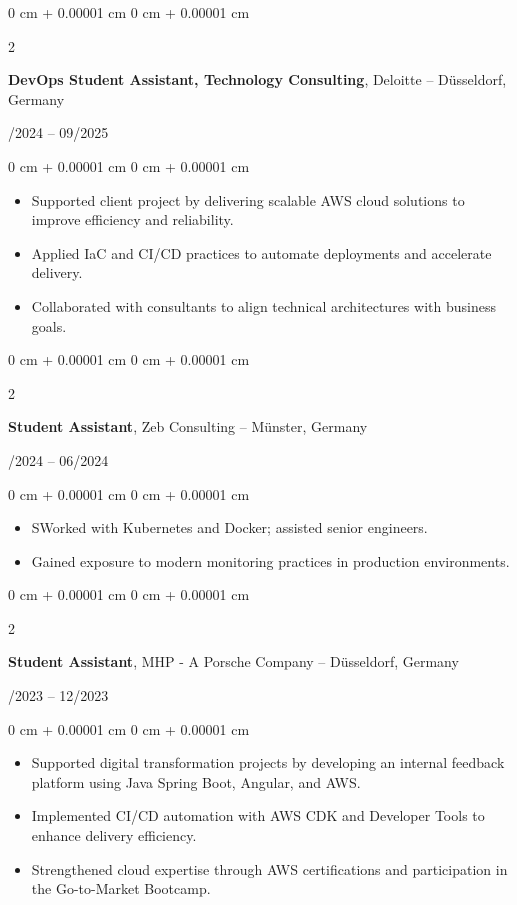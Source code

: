 \documentclass[10pt, letterpaper]{article}
\newenvironment{highlights}{
    \begin{itemize}[
        topsep=0.10 cm,
        parsep=0.10 cm,
        partopsep=0pt,
        itemsep=0pt,
        leftmargin=0 cm + 10pt
    ]
}{
    \end{itemize}
} %
\newenvironment{onecolentry}{
    \begin{adjustwidth}{
        0 cm + 0.00001 cm
    }{
        0 cm + 0.00001 cm
    }
}{
    \end{adjustwidth}
} %
\newenvironment{twocolentry}[2][]{
    \onecolentry
    \def\secondColumn{#2}
    \setcolumnwidth{\fill, 4.5 cm}
    \begin{paracol}{2}
}{
    \switchcolumn \raggedleft \secondColumn
    \end{paracol}
    \endonecolentry
} %
\begin{document}
\vspace{0.2cm}

 \begin{twocolentry}{
            07/2024 – 09/2025
        }
\textbf{DevOps Student Assistant, Technology Consulting}, Deloitte -- Düsseldorf, Germany
\end{twocolentry}
\begin{onecolentry}
\begin{highlights}
    \item Supported client project by delivering scalable AWS cloud solutions to improve efficiency and reliability.  
    \item Applied IaC and CI/CD practices to automate deployments and accelerate delivery.  
    \item Collaborated with consultants to align technical architectures with business goals.  
\end{highlights}
\end{onecolentry}

\vspace{0.2cm}

\begin{twocolentry}{01/2024 -- 06/2024}
\textbf{Student Assistant}, Zeb Consulting -- Münster, Germany
\end{twocolentry}
\begin{onecolentry}
\begin{highlights}
\item SWorked with Kubernetes and Docker; assisted senior engineers.
\item Gained exposure to modern monitoring practices in production environments.
\end{highlights}
\end{onecolentry}

\vspace{0.2cm}



\begin{twocolentry}{03/2023 -- 12/2023}
    \textbf{Student Assistant}, MHP - A Porsche Company -- Düsseldorf, Germany
    \end{twocolentry}
    \begin{onecolentry}
    \begin{highlights}
        \item Supported digital transformation projects by developing an internal feedback platform using Java Spring Boot, Angular, and AWS.  
        \item Implemented CI/CD automation with AWS CDK and Developer Tools to enhance delivery efficiency.  
        \item Strengthened cloud expertise through AWS certifications and participation in the Go-to-Market Bootcamp.  
    \end{highlights}
    \end{onecolentry}
    
\end{document}
